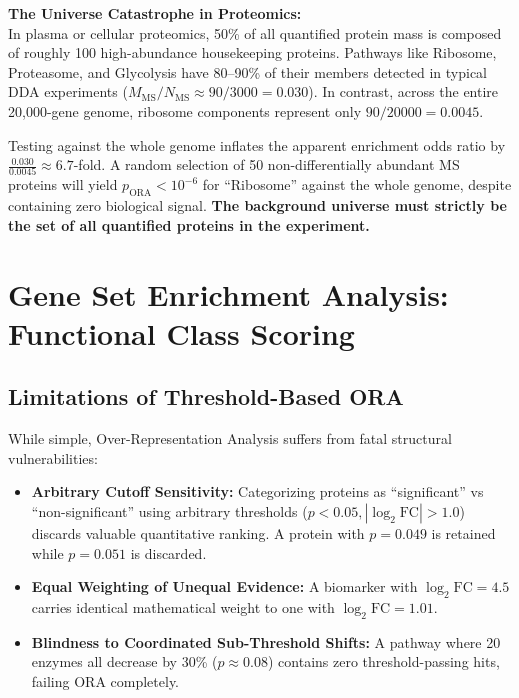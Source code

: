 \documentclass[11pt,twoside,openright]{book}
\begin{document}
\begin{pitfallbox}
\textbf{The Universe Catastrophe in Proteomics:}\\
In plasma or cellular proteomics, 50\% of all quantified protein mass is composed of roughly 100 high-abundance housekeeping proteins. Pathways like Ribosome, Proteasome, and Glycolysis have 80--90\% of their members detected in typical DDA experiments ($M_{\text{MS}} / N_{\text{MS}} \approx 90 / 3000 = 0.030$). In contrast, across the entire 20,000-gene genome, ribosome components represent only $90 / 20000 = 0.0045$. 

Testing against the whole genome inflates the apparent enrichment odds ratio by $\frac{0.030}{0.0045} \approx 6.7$-fold. A random selection of 50 non-differentially abundant MS proteins will yield $p_{\text{ORA}} < 10^{-6}$ for ``Ribosome'' against the whole genome, despite containing zero biological signal. \textbf{The background universe must strictly be the set of all quantified proteins in the experiment.}
\end{pitfallbox}

\section{Gene Set Enrichment Analysis: Functional Class Scoring}

\subsection{Limitations of Threshold-Based ORA}

While simple, Over-Representation Analysis suffers from fatal structural vulnerabilities:
\begin{itemize}
    \item \textbf{Arbitrary Cutoff Sensitivity:} Categorizing proteins as ``significant'' vs ``non-significant'' using arbitrary thresholds ($p < 0.05, |\log_2 \text{FC}| > 1.0$) discards valuable quantitative ranking. A protein with $p = 0.049$ is retained while $p = 0.051$ is discarded.
    \item \textbf{Equal Weighting of Unequal Evidence:} A biomarker with $\log_2 \text{FC} = 4.5$ carries identical mathematical weight to one with $\log_2 \text{FC} = 1.01$.
    \item \textbf{Blindness to Coordinated Sub-Threshold Shifts:} A pathway where 20 enzymes all decrease by 30\% ($p \approx 0.08$) contains zero threshold-passing hits, failing ORA completely.
\end{itemize}
\end{document}
